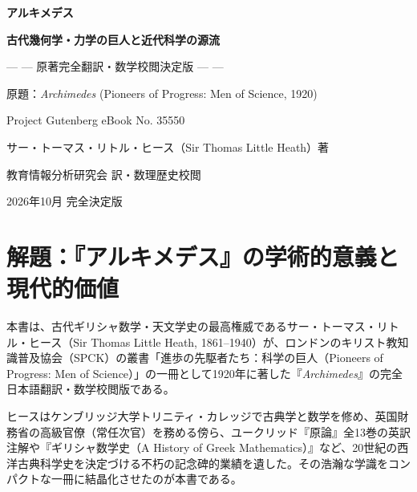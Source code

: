 \documentclass[a4paper,11pt,openany]{ltjsbook}
\begin{document}
\frontmatter

\begin{titlepage}
    \centering
    \vspace*{2.0cm}
    {\Huge\textbf{アルキメデス}\par}
    \vspace{0.4cm}
    {\Large\textbf{古代幾何学・力学の巨人と近代科学の源流}\par}
    \vspace{0.8cm}
    {\large — — 原著完全翻訳・数学校閲決定版 — —\par}
    \vspace{1.5cm}
    {\large 原題：\textit{Archimedes} (Pioneers of Progress: Men of Science, 1920)\par}
    \vspace{0.3cm}
    {\large Project Gutenberg eBook No. 35550\par}
    \vspace{2.5cm}
    {\Large サー・トーマス・リトル・ヒース（Sir Thomas Little Heath）著\par}
    \vspace{0.5cm}
    {\large 教育情報分析研究会 訳・数理歴史校閲\par}
    \vfill
    {\large 2026年10月 完全決定版\par}
    \vspace*{1.0cm}
\end{titlepage}

\tableofcontents
\clearpage

\chapter*{解題：『アルキメデス』の学術的意義と現代的価値}

本書は、古代ギリシャ数学・天文学史の最高権威であるサー・トーマス・リトル・ヒース（Sir Thomas Little Heath, 1861--1940）が、ロンドンのキリスト教知識普及協会（SPCK）の叢書「進歩の先駆者たち：科学の巨人（Pioneers of Progress: Men of Science）」の一冊として1920年に著した『\textit{Archimedes}』の完全日本語翻訳・数学校閲版である。

ヒースはケンブリッジ大学トリニティ・カレッジで古典学と数学を修め、英国財務省の高級官僚（常任次官）を務める傍ら、ユークリッド『原論』全13巻の英訳注解や『ギリシャ数学史（A History of Greek Mathematics）』など、20世紀の西洋古典科学史を決定づける不朽の記念碑的業績を遺した。その浩瀚な学識をコンパクトな一冊に結晶化させたのが本書である。
\end{document}
